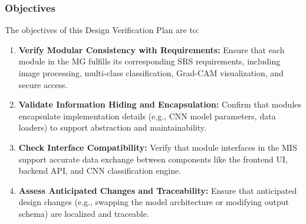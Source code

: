 \documentclass[12pt, titlepage]{article}
\begin{document}
\subsubsection{Objectives}
The objectives of this Design Verification Plan are to:
\begin{enumerate}
  \item \textbf{Verify Modular Consistency with Requirements:} Ensure that each module in the MG fulfills its corresponding SRS requirements, including image processing, multi-class classification, Grad-CAM visualization, and secure access.
  \item \textbf{Validate Information Hiding and Encapsulation:} Confirm that modules encapsulate implementation details (e.g., CNN model parameters, data loaders) to support abstraction and maintainability.
  \item \textbf{Check Interface Compatibility:} Verify that module interfaces in the MIS support accurate data exchange between components like the frontend UI, backend API, and CNN classification engine.
  \item \textbf{Assess Anticipated Changes and Traceability:} Ensure that anticipated design changes (e.g., swapping the model architecture or modifying output schema) are localized and traceable.
\end{enumerate}
\end{document}
